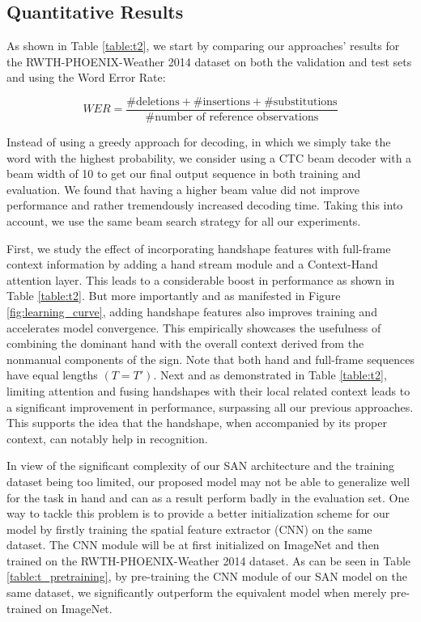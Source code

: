 \documentclass[a4paper,conference]{IEEEtran}
\begin{document}
\subsection{Quantitative Results}

As shown in Table \ref{table:t2}, we start by comparing our approaches' results for the RWTH-PHOENIX-Weather 2014 dataset on both the validation and test sets and using the Word Error Rate: 

\begin{equation}
WER = \frac{\#\text{deletions} + \#\text{insertions} + \#\text{substitutions}}{\#\text{number of reference observations}}
\label{eq:5}
\end{equation}

Instead of using a greedy approach for decoding, in which we simply take the word with the highest probability, we consider using a CTC beam decoder with a beam width of 10 to get our final output sequence in both training and evaluation. We found that having a higher beam value did not improve performance and rather tremendously increased decoding time. Taking this into account, we use the same beam search strategy for all our experiments.  



First, we study the effect of incorporating handshape features with full-frame context information by adding a hand stream module and a Context-Hand attention layer. 
This leads to a considerable boost in performance as shown in Table \ref{table:t2}. But more importantly and as manifested in Figure \ref{fig:learning_curve}, adding handshape features also improves training and accelerates model convergence. This empirically showcases the usefulness of combining the dominant hand with the overall context derived from the nonmanual components of the sign.
Note that both hand and full-frame sequences have equal lengths $(T = T')$. Next and as demonstrated in Table \ref{table:t2}, limiting attention and fusing handshapes with their local related context leads to a significant improvement in performance, surpassing all our previous approaches. This supports the idea that the handshape, when accompanied by its proper context, can notably help in recognition.
















In view of the significant complexity of our SAN architecture and the training dataset being too limited, our proposed model may not be able to generalize well for the task in hand and can as a result perform badly in the evaluation set. One way to tackle this problem is to provide a better initialization scheme for our model by firstly training the spatial feature extractor (CNN) on the same dataset. The CNN module will be at first initialized on ImageNet and then trained on the RWTH-PHOENIX-Weather 2014 dataset. As can be seen in Table \ref{table:t_pretraining}, by pre-training the CNN module of our SAN model on the same dataset, we significantly outperform the equivalent model when merely pre-trained on ImageNet.
\end{document}
